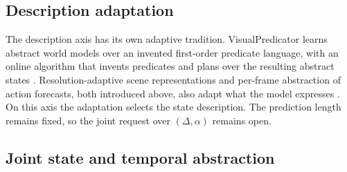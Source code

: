 \subsection{Description adaptation}
\label{sec:app:rel:description}

The description axis has its own adaptive tradition. VisualPredicator learns abstract world models over an invented first-order predicate language, with an online algorithm that invents predicates and plans over the resulting abstract states \citep{liang2025visualpredicator}. Resolution-adaptive scene representations and per-frame abstraction of action forecasts, both introduced above, also adapt what the model expresses \citep{wang2023dynamic,scarafoni2022islands}. On this axis the adaptation selects the state description. The prediction length remains fixed, so the joint request over $(\Delta, \alpha)$ remains open.

\subsection{Joint state and temporal abstraction}
\label{sec:app:rel:joint}

